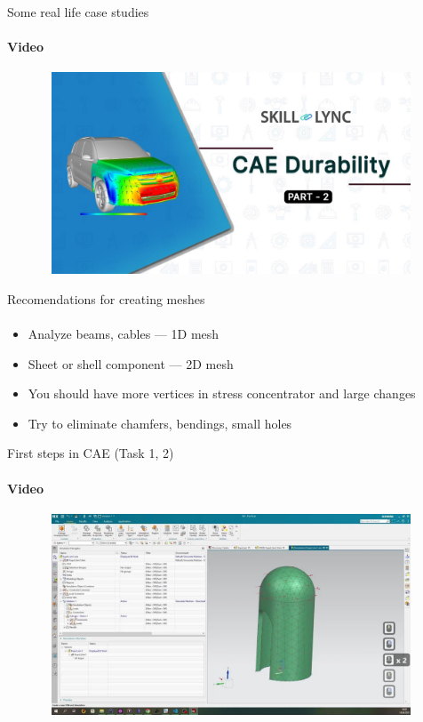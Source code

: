 \documentclass[aspectratio=169]{beamer}
\begin{document}
\begin{frame}[t]{Some real life case studies}
    \framesubtitle{Video}
    \vspace{-0.6cm}
    \begin{figure}[H]
        \href{https://youtu.be/BkTJ-PdliC4?t=374}{
            \centering\includegraphics[height=6cm,width=1\textwidth,keepaspectratio]{cae_durability_video.jpg}}
        \label{fig:cae_durability_video.jpg}
    \end{figure}
\end{frame}

\begin{frame}[t]{Recomendations for creating meshes}
\framesubtitle{}
    \begin{itemize}
        \item Analyze beams, cables --- 1D mesh
        \item Sheet or shell component --- 2D mesh
        \item You should have more vertices in stress concentrator and large changes
        \item Try to eliminate chamfers, bendings, small holes
    \end{itemize}
\end{frame}

\begin{frame}[t]{First steps in CAE (Task 1, 2)}
    \framesubtitle{Video}
    \vspace{-0.6cm}
    \begin{figure}[H]
        \href{https://disk.yandex.ru/i/zj26vr7Uk03ilA}{
            \centering\includegraphics[height=6cm,width=1\textwidth,keepaspectratio]{basics_cae_video.png}}
        \label{fig:basics_cae_video.png}
    \end{figure}
\end{frame}
\end{document}
